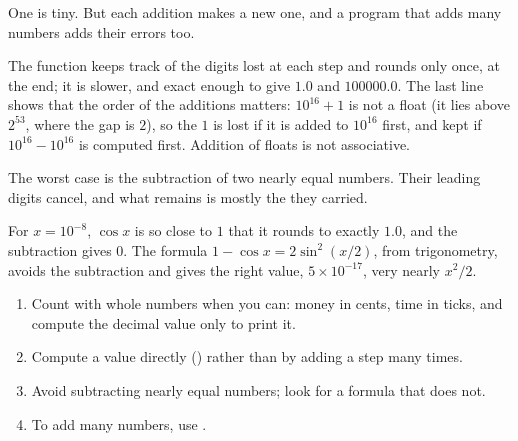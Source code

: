 One  is tiny. But each addition makes a new one, and a program that adds many numbers adds their
errors too.

\label{lst:g10:floating-point:sum-tenths}

\label{out:g10:floating-point:sum-tenths}

The function  keeps track of the digits lost at each step and rounds only once, at the end; it is
slower, and exact enough to give $1.0$ and $100000.0$. The last line shows that the order of the additions matters:
$10^{16} + 1$ is not a float (it lies above $2^{53}$, where the gap is $2$), so the $1$ is lost if it is added to
$10^{16}$ first, and kept if $10^{16} - 10^{16}$ is computed first. Addition of floats is not associative.

The worst case is the subtraction of two nearly equal numbers. Their leading digits cancel, and what remains is
mostly the  they carried.

\label{lst:g10:floating-point:cancel}

\label{out:g10:floating-point:cancel}

For $x = 10^{-8}$, $\cos x$ is so close to $1$ that it rounds to exactly $1.0$, and the subtraction gives $0$. The
formula $1 - \cos x = 2\sin^2(x/2)$, from trigonometry, avoids the subtraction and gives the right value,
$5 \times 10^{-17}$, very nearly $x^2/2$.

\begin{method}\label{met:g10:floating-point:keep-small}
\begin{enumerate}
  \item Count with whole numbers when you can: money in cents, time in ticks, and compute the decimal value only to
    print it.
  \item Compute a value directly () rather than by adding a step many times.
  \item Avoid subtracting nearly equal numbers; look for a formula that does not.
  \item To add many numbers, use .
\end{enumerate}
\end{method}

